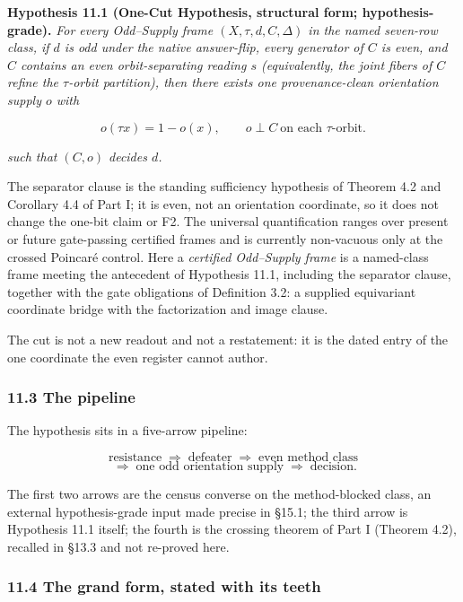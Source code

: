 \documentclass[10pt,twocolumn]{article}
\begin{document}
\textbf{Hypothesis 11.1 (One-Cut Hypothesis, structural form;
hypothesis-grade).} \emph{For every Odd--Supply frame
\((X, \tau, d, C, \Delta)\) in the named seven-row class, if \(d\) is
odd under the native answer-flip, every generator of \(C\) is even, and
\(C\) contains an even orbit-separating reading \(s\) (equivalently, the
joint fibers of \(C\) refine the \(\tau\)-orbit partition), then there
exists one provenance-clean orientation supply \(o\) with}

\[o(\tau x) = 1 - o(x), \qquad o \perp C \ \text{on each $\tau$-orbit}.\]

\emph{such that \((C, o)\) decides \(d\).}

The separator clause is the standing sufficiency hypothesis of Theorem
4.2 and Corollary 4.4 of Part I; it is even, not an orientation
coordinate, so it does not change the one-bit claim or F2. The universal
quantification ranges over present or future gate-passing certified
frames and is currently non-vacuous only at the crossed Poincaré
control. Here a \emph{certified Odd--Supply frame} is a named-class
frame meeting the antecedent of Hypothesis 11.1, including the separator
clause, together with the gate obligations of Definition 3.2: a supplied
equivariant coordinate bridge with the factorization and image clause.

The cut is not a new readout and not a restatement: it is the dated
entry of the one coordinate the even register cannot author.

\subsubsection{11.3 The pipeline}\label{the-pipeline}

The hypothesis sits in a five-arrow pipeline:

\[\text{resistance} \;\Rightarrow\; \text{defeater} \;\Rightarrow\; \text{even method class}\]
\[\;\Rightarrow\; \text{one odd orientation supply} \;\Rightarrow\; \text{decision}.\]

The first two arrows are the census converse on the method-blocked
class, an external hypothesis-grade input made precise in §15.1; the
third arrow is Hypothesis 11.1 itself; the fourth is the crossing
theorem of Part I (Theorem 4.2), recalled in §13.3 and not re-proved
here.

\subsubsection{11.4 The grand form, stated with its
teeth}\label{the-grand-form-stated-with-its-teeth}
\end{document}
